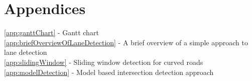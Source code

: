 \documentclass[]{aiaa-tc}%
\begin{document}
%
%
\newpage
\section*{Appendices}
\ref{app:ganttChart} - Gantt chart \\

\ref{app:briefOverviewOfLaneDetection} - A brief overview of a simple approach to lane detection \\

\ref{app:slidingWindow} - Sliding window detection for curved roads \\

\ref{app:modelDetection} - Model based intersection detection approach \\




%


\appendix
\pagestyle{empty}
 
\end{document}
